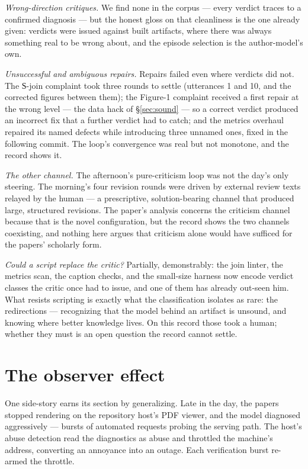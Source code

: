 \documentclass[12pt]{article}
\begin{document}
\emph{Wrong-direction critiques.} We find none in the corpus — every verdict traces to a confirmed diagnosis — but the honest gloss on that cleanliness is the one already given: verdicts were issued against built artifacts, where there was always something real to be wrong about, and the episode selection is the author-model's own.

\emph{Unsuccessful and ambiguous repairs.} Repairs failed even where verdicts did not. The Ѕ-join complaint took three rounds to settle (utterances 1 and 10, and the corrected figures between them); the Figure-1 complaint received a first repair at the wrong level — the data hack of \S\ref{sec:sound} — so a correct verdict produced an incorrect fix that a further verdict had to catch; and the metrics overhaul repaired its named defects while introducing three unnamed ones, fixed in the following commit. The loop's convergence was real but not monotone, and the record shows it.

\emph{The other channel.} The afternoon's pure-criticism loop was not the day's only steering. The morning's four revision rounds were driven by external review texts relayed by the human — a prescriptive, solution-bearing channel that produced large, structured revisions. The paper's analysis concerns the criticism channel because that is the novel configuration, but the record shows the two channels coexisting, and nothing here argues that criticism alone would have sufficed for the papers' scholarly form.

\emph{Could a script replace the critic?} Partially, demonstrably: the join linter, the metrics scan, the caption checks, and the small-size harness now encode verdict classes the critic once had to issue, and one of them has already out-seen him. What resists scripting is exactly what the classification isolates as rare: the redirections — recognizing that the model behind an artifact is unsound, and knowing where better knowledge lives. On this record those took a human; whether they must is an open question the record cannot settle.

\section{The observer effect}\label{sec:observer}

One side-story earns its section by generalizing. Late in the day, the papers stopped rendering on the repository host's PDF viewer, and the model diagnosed aggressively — bursts of automated requests probing the serving path. The host's abuse detection read the diagnostics as abuse and throttled the machine's address, converting an annoyance into an outage. Each verification burst re-armed the throttle.
\end{document}
